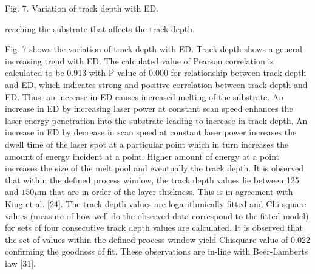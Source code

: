\documentclass[10pt]{article}
\begin{document}
Fig. 7. Variation of track depth with ED.

reaching the substrate that affects the track depth.

Fig. 7 shows the variation of track depth with ED. Track depth shows a general increasing trend with ED. The calculated value of Pearson correlation is calculated to be 0.913 with P-value of 0.000 for relationship between track depth and ED, which indicates strong and positive correlation between track depth and ED. Thus, an increase in ED causes increased melting of the substrate. An increase in ED by increasing laser power at constant scan speed enhances the laser energy penetration into the substrate leading to increase in track depth. An increase in ED by decrease in scan speed at constant laser power increases the dwell time of the laser spot at a particular point which in turn increases the amount of energy incident at a point. Higher amount of energy at a point increases the size of the melt pool and eventually the track depth. It is observed that within the defined process window, the track depth values lie between 125 and $150 \mu \mathrm{m}$ that are in order of the layer thickness. This is in agreement with King et al. [24]. The track depth values are logarithmically fitted and Chi-square values (measure of how well do the observed data correspond to the fitted model) for sets of four consecutive track depth values are calculated. It is observed that the set of values within the defined process window yield Chisquare value of 0.022 confirming the goodness of fit. These observations are in-line with Beer-Lamberts law [31].
\end{document}
